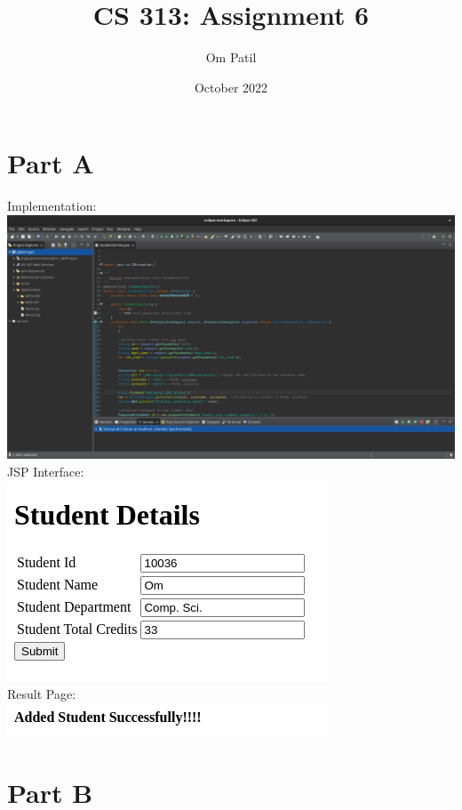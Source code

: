 \documentclass{article}
\title{CS 313: Assignment 6}
\author{Om Patil}
\date{October 2022}
\begin{document}
\maketitle

\section*{Part A}
Implementation: \\\includegraphics[width=1.2\linewidth]{screenshots/parta/implementation.png}
\pagebreak
\\JSP Interface: \\\includegraphics[scale=0.6]{screenshots/parta/form.png}
\\Result Page: \\\includegraphics[scale=0.6]{screenshots/parta/success.png}

\section*{Part B}
\end{document}
